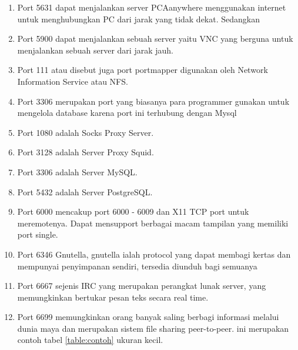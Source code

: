 \documentclass[12pt,a4paper]{article}
\begin{document}
\begin{enumerate}
\item Port 5631 dapat menjalankan server PCAanywhere menggunakan internet untuk menghubungkan PC dari jarak yang tidak dekat.
Sedangkan 
\item Port 5900 dapat menjalankan sebuah server yaitu VNC yang berguna untuk menjalankan sebuah server dari jarak jauh.
\item Port 111 atau disebut juga port portmapper digunakan oleh Network Information Service atau NFS.
\item Port 3306 merupakan port yang biasanya para programmer gunakan untuk mengelola database karena port ini terhubung dengan Mysql
\item Port 1080 adalah Socks Proxy Server.
\item Port 3128 adalah Server Proxy Squid.
\item Port 3306 adalah Server MySQL.
\item Port 5432 adalah Server PostgreSQL.
\item Port 6000 mencakup port 6000 - 6009 dan X11 TCP port untuk meremotenya. Dapat mensupport berbagai macam tampilan yang memiliki port single.
\item Port 6346 Gnutella, gnutella ialah protocol yang dapat membagi kertas dan mempunyai penyimpanan sendiri, tersedia diunduh bagi semuanya
\item Port 6667 sejenis IRC yang merupakan perangkat lunak server, yang memungkinkan bertukar pesan teks secara real time.
\item Port 6699 memungkinkan orang banyak saling berbagi informasi melalui dunia maya dan  merupakan sistem file sharing peer-to-peer.
ini merupakan contoh tabel \ref{table:contoh} ukuran kecil.


\end{enumerate}
\end{document}
